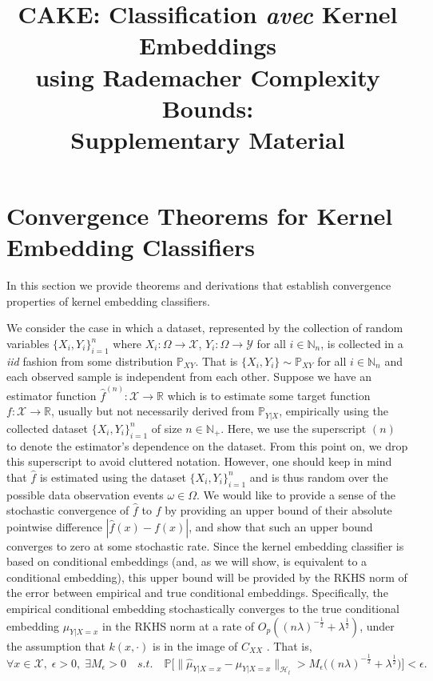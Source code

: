 \documentclass{article}
\title{CAKE: Classification \textit{avec} Kernel Embeddings \\ using Rademacher Complexity Bounds: \\ Supplementary Material}
\author{
}
\numberwithin{equation}{section}
\numberwithin{table}{section}
\numberwithin{algorithm}{section}
\begin{document}
	
	\maketitle
	
	\appendix
	
	\section{Convergence Theorems for Kernel Embedding Classifiers}
	\label{app:convergence_theorems}
	
	In this section we provide theorems and derivations that establish convergence properties of kernel embedding classifiers.
	
	We consider the case in which a dataset, represented by the collection of random variables $\{X_{i}, Y_{i}\}_{i = 1}^{n}$ where $X_{i} : \Omega \to \mathcal{X}$,  $Y_{i} : \Omega \to \mathcal{Y}$ for all $i \in \mathbb{N}_{n}$, is collected in a \textit{iid} fashion from some distribution $\mathbb{P}_{X Y}$. That is $\{X_{i}, Y_{i}\} \sim \mathbb{P}_{X Y}$ for all $i \in \mathbb{N}_{n}$ and each observed sample is independent from each other. Suppose we have an estimator function $\hat{f}^{(n)} : \mathcal{X} \to \mathbb{R}$ which is to estimate some target function  $f : \mathcal{X} \to \mathbb{R}$, usually but not necessarily derived from $\mathbb{P}_{Y |X }$, empirically using the collected dataset $\{X_{i}, Y_{i}\}_{i = 1}^{n}$ of size $n \in \mathbb{N}_{+}$. Here, we use the superscript $(n)$ to denote the estimator's dependence on the dataset. From this point on, we drop this superscript to avoid cluttered notation. However, one should keep in mind that $\hat{f}$ is estimated using the dataset $\{X_{i}, Y_{i}\}_{i = 1}^{n}$ and is thus random over the possible data observation events $\omega \in \Omega$. We would like to provide a sense of the stochastic convergence of $\hat{f}$ to $f$ by providing an upper bound of their absolute pointwise difference $| \hat{f}(x) - f(x) |$, and show that such an upper bound converges to zero at some stochastic rate. Since the kernel embedding classifier is based on conditional embeddings (and, as we will show, is equivalent to a conditional embedding), this upper bound will be provided by the RKHS norm of the error between empirical and true conditional embeddings. Specifically, the empirical conditional embedding stochastically converges to the true conditional embedding $\mu_{Y | X = x}$ in the RKHS norm at a rate of $O_{p}((n \lambda)^{-\frac{1}{2}} + \lambda^{\frac{1}{2}})$, under the assumption that $k(x, \cdot)$ is in the image of $C_{XX}$ \cite[Theorem 6]{song2009hilbert}. That is,
	\begin{equation}
	\forall x \in \mathcal{X}, \; \epsilon > 0, \; \exists M_{\epsilon} > 0 \quad s.t. \quad \mathbb{P}\Big[\big\| \hat{\mu}_{Y | X = x} - \mu_{Y | X = x} \big\|_{\mathcal{H}_{l}} > M_{\epsilon} \Big((n \lambda)^{-\frac{1}{2}} + \lambda^{\frac{1}{2}}\Big)\Big] < \epsilon.
	\label{eq:empirical_conditional_embedding_stochastic_convergence}
	\end{equation}
	
\end{document}
